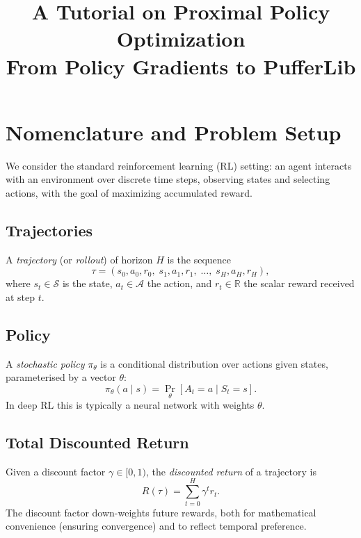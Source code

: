 \documentclass[12pt, a4paper]{article}
\title{\textbf{A Tutorial on Proximal Policy Optimization}\\[0.5em]
\large From Policy Gradients to PufferLib}
\author{}
\date{}
\theoremstyle{definition}
\theoremstyle{plain}
\theoremstyle{remark}
\newcommand{\R}{\mathbb{R}}
\newcommand{\traj}{\tau}
\newcommand{\pith}{\pi_\theta}
\newcommand{\Rtraj}{R(\traj)}
\begin{document}
\maketitle
\tableofcontents
\newpage

\section{Nomenclature and Problem Setup}
\label{sec:nomenclature}

We consider the standard reinforcement learning (RL) setting: an agent interacts with an
environment over discrete time steps, observing states and selecting actions, with the
goal of maximizing accumulated reward.

\subsection{Trajectories}

A \emph{trajectory} (or \emph{rollout}) of horizon $H$ is the sequence
\begin{equation}
  \traj = (s_0, a_0, r_0,\; s_1, a_1, r_1,\; \ldots,\; s_H, a_H, r_H),
\end{equation}
where $s_t \in \mathcal{S}$ is the state, $a_t \in \mathcal{A}$ the action, and
$r_t \in \R$ the scalar reward received at step $t$.

\subsection{Policy}

A \emph{stochastic policy} $\pith$ is a conditional distribution over actions given states,
parameterised by a vector $\theta$:
\begin{equation}
  \pith(a \mid s) = \Pr_\theta[A_t = a \mid S_t = s].
\end{equation}
In deep RL this is typically a neural network with weights $\theta$.

\subsection{Total Discounted Return}

Given a discount factor $\gamma \in [0, 1)$, the \emph{discounted return} of a
trajectory is
\begin{equation}
  \Rtraj = \sum_{t=0}^{H} \gamma^t r_t.
\end{equation}
The discount factor down-weights future rewards, both for mathematical convenience
(ensuring convergence) and to reflect temporal preference.
\end{document}
